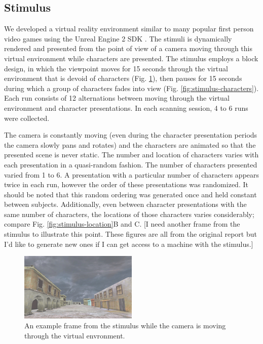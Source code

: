 \documentclass[final]{article}
\begin{document}
\subsection{Stimulus}
We developed a virtual reality environment similar to many popular first person video games using the Unreal Engine 2 SDK \cite{UnrealEngine2}.
The stimuli is dynamically rendered and presented from the point of view of a camera moving through this virtual environment while characters are presented.
The stimulus employs a  block design, in which the viewpoint moves for 15 seconds through the 
virtual environment that is devoid of characters (Fig. \ref{fig:stimulus-movement}), then pauses for 15 seconds during 
which a group of characters fades into view (Fig. \ref{fig:stimulus-characters}).
Each run consists of 12 alternations between moving through the virtual environment and character presentations. 
In each scanning session, 4 to 6 runs were collected.

The camera is constantly moving (even during the character presentation periods the camera slowly pans and rotates) and the characters are animated so that the presented scene is never static.
The number and location of characters varies with each presentation in a quasi-random fashion.
The number of characters presented varied from 1 to 6.
A presentation with a particular number of characters appears twice in each run, however the order of these presentations was randomized.
It should be noted that this random ordering was generated once and held constant between subjects.
Additionally, even between character presentations with the same number of characters, the locations of 
those characters varies considerably; compare Fig. \ref{fig:stimulus-location}B and C.
[I need another frame from the stimulus to illustrate this point. These figures are all from the original report but I'd like to generate new ones if I can get access to a machine with the stimulus.]

\begin{figure}[!htbp]
\centering
\includegraphics[width=0.5\textwidth]{figures/stimulus-movement}
\caption{An example frame from the stimulus while the camera is moving through the virtual envronment.}
\label{fig:stimulus-movement}
\end{figure}
\end{document}
